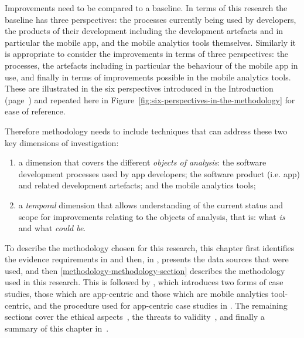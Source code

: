 Improvements need to be compared to a baseline. In terms of this research the baseline has three perspectives: the processes currently being used by developers, the products of their development including the development artefacts and in particular the mobile app, and the mobile analytics tools themselves. Similarly it is appropriate to consider the improvements in terms of three perspectives: the processes, the artefacts including in particular the behaviour of the mobile app in use, and finally in terms of improvements possible in the mobile analytics tools. These are illustrated in the six perspectives introduced in the Introduction (page~\pageref{rq-leads-to-six-perspectives}) and repeated here in Figure~\ref{fig:six-perspectives-in-the-methodology} for ease of reference.

Therefore methodology needs to include techniques that can address these two key dimensions of investigation:
\begin{enumerate}
    \item a dimension that covers the different \emph{objects of analysis}: the software development processes used by app developers; the software product (i.e. app) and related development artefacts; and the mobile analytics tools; 
    
    \item a \emph{temporal} dimension that allows understanding of the current status and scope for improvements relating to the objects of analysis, that is: what \emph{is} and what \emph{could be}.
\end{enumerate}


\medskip

To describe the methodology chosen for this research, this chapter first identifies the evidence requirements in  and then, in , presents the data sources that were used, and then \autoref{methodology-methodology-section} describes the methodology used in this research. This is followed by , which introduces two forms of case studies, those which are app-centric and those which are mobile analytics tool-centric, and the procedure used for app-centric case studies in . The remaining sections cover the ethical aspects~, the threats to validity~, and finally a summary of this chapter in~. 

